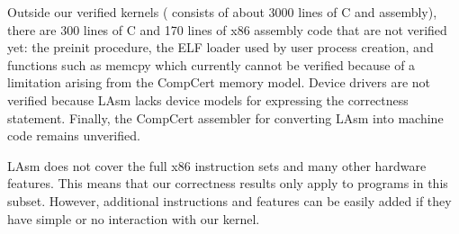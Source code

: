 {Outside our verified kernels
(\mCTOShyper{} consists of about 3000 lines of C and assembly), there
are 300 lines of C and 170 lines of x86 assembly code that are not
verified yet: the preinit procedure, the ELF loader used by user
process creation, and functions such as \textsf{memcpy} which currently
cannot be verified because of a limitation arising from the CompCert
memory model. Device drivers are not verified because LAsm
lacks device models for expressing the correctness
statement.  Finally, the CompCert assembler for converting LAsm into
machine code remains unverified. 

LAsm does not cover the full x86 instruction sets and many other
hardware features.  This means that our correctness results only apply
to programs in this subset. However, additional instructions and
features can be easily added if they have simple or no interaction
with our kernel.}


